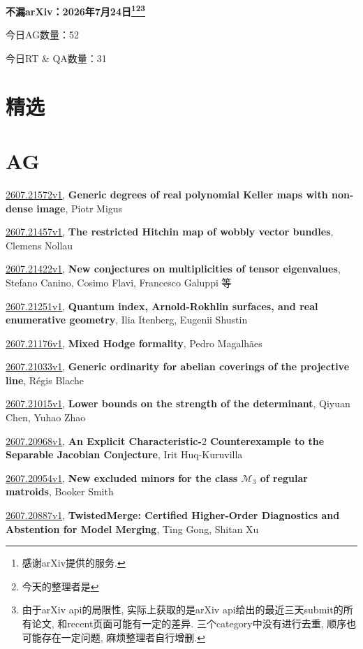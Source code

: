 \documentclass[9pt, a4paper]{article}
\theoremstyle{plain}
\theoremstyle{definition}
\theoremstyle{remark}
\newcommand{\arxiv}[3]{\href{https://arxiv.org/abs/#1}{#1}, \textbf{\textcolor{arxivblue}{#2}}, #3}
\newcommand{\AGnumber}{52}
\newcommand{\RTQAnumber}{31}
\newcommand{\NewestDate}{2026年7月24日}
\newcommand{\todayarXiver}{} %
\begin{document}
\begin{center}
    \Huge\textbf{不漏arXiv：\NewestDate\footnote{感谢arXiv提供的服务.}\footnote{今天的整理者是\todayarXiver}\footnote{由于arXiv api的局限性, 实际上获取的是arXiv api给出的最近三天submit的所有论文, 和recent页面可能有一定的差异. 三个category中没有进行去重, 顺序也可能存在一定问题, 麻烦整理者自行增删.}} \\
\end{center}

\setcounter{section}{-1}

\begin{center}
    今日AG数量：\AGnumber
    
    今日RT \& QA数量：\RTQAnumber
    
\end{center}


\section{精选}


\section{AG}
\arxiv{2607.21572v1}{Generic degrees of real polynomial Keller maps with non-dense image}{Piotr Migus}

\arxiv{2607.21457v1}{The restricted Hitchin map of wobbly vector bundles}{Clemens Nollau}

\arxiv{2607.21422v1}{New conjectures on multiplicities of tensor eigenvalues}{Stefano Canino, Cosimo Flavi, Francesco Galuppi 等}

\arxiv{2607.21251v1}{Quantum index, Arnold-Rokhlin surfaces, and real enumerative geometry}{Ilia Itenberg, Eugenii Shustin}

\arxiv{2607.21176v1}{Mixed Hodge formality}{Pedro Magalhães}

\arxiv{2607.21033v1}{Generic ordinarity for abelian coverings of the projective line}{Régis Blache}

\arxiv{2607.21015v1}{Lower bounds on the strength of the determinant}{Qiyuan Chen, Yuhao Zhao}

\arxiv{2607.20968v1}{An Explicit Characteristic-$2$ Counterexample to the Separable Jacobian Conjecture}{Irit Huq-Kuruvilla}

\arxiv{2607.20954v1}{New excluded minors for the class $\mathcal{M}_3$ of regular matroids}{Booker Smith}

\arxiv{2607.20887v1}{TwistedMerge: Certified Higher-Order Diagnostics and Abstention for Model Merging}{Ting Gong, Shitan Xu}
\end{document}
